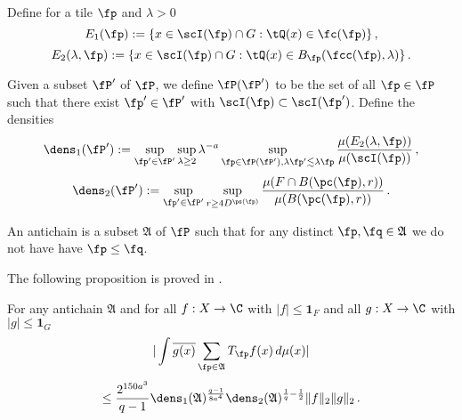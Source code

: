 Define for a tile $\fp$ and $\lambda>0$
\begin{equation}\label{definee1}
    E_1(\fp):=\{x\in \scI(\fp)\cap G: \tQ(x)\in \fc(\fp)\}\, ,
\end{equation}
\begin{equation}\label{definee2}
    E_2(\lambda, \fp):=\{x\in \scI(\fp)\cap G: \tQ(x)\in B_{\fp}(\fcc(\fp), \lambda)\}\, .
\end{equation}



Given a subset $\fP'$ of $\fP$, we define
$\fP(\fP')$ to be the set of
all $\fp \in \fP$ such that there exist $\fp' \in \fP'$ with $\scI(\fp)\subset \scI(\fp')$. Define the densities
\begin{equation}\label{definedens1}
    {\dens}_1(\fP') := \sup_{\fp'\in \fP'}\sup_{\lambda \geq 2} \lambda^{-a} \sup_{\fp \in \fP(\fP'), \lambda \fp' \lesssim \lambda \fp}
    \frac{\mu({E}_2(\lambda, \fp))}{\mu(\scI(\fp))}\, ,
\end{equation}
\begin{equation}\label{definedens2}
    {\dens}_2(\fP') := \sup_{\fp'\in \fP'}
    \sup_{r\ge 4D^{\ps(\fp)}}
    \frac{\mu(F\cap B(\pc(\fp),r))}{\mu(B(\pc(\fp),r))}\, .
\end{equation}





An antichain is a subset $\mathfrak{A}$
of $\fP$ such that for any distinct $\fp,\fq\in \mathfrak{A}$ we do not have have $\fp\le \fq$.

The following proposition is proved in .

\begin{proposition}
\label{antichain-operator}
\leanok
{}

For any antichain $\mathfrak{A} $ and for all $f:X\to \C$ with $|f|\le \mathbf{1}_F$ and all $g:X\to\C$ with $|g| \le \mathbf{1}_G$
\begin{equation} \label{eq-antiprop}
    |\int \overline{g(x)} \sum_{\fp \in \mathfrak{A}} T_{\fp} f(x)\, d\mu(x)|
\end{equation}
\begin{equation}
    \le \frac{2^{150a^3}}{q-1} \dens_1(\mathfrak{A})^{\frac {q-1}{8a^4}}\dens_2(\mathfrak{A})^{\frac 1{q}-\frac 12} \|f\|_2 \|g\|_2\, .
\end{equation}
\end{proposition}

